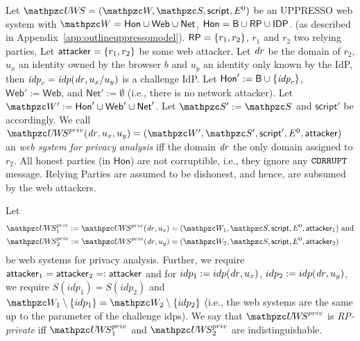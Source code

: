   \begin{definition}\label{def:uppresso-ws-priv}
    Let $\uppressowebsystem = (\bidsystem, \scriptset, \mathsf{script}, E^0)$ be an UPPRESSO web system with 
    $\bidsystem = \mathsf{Hon} \cup \mathsf{Web} \cup \mathsf{Net}$, 
    $\mathsf{Hon} = \mathsf{B} \cup \mathsf{RP} \cup \mathsf{IDP}$. (as described in Appendix~\ref{app:outlineuppressomodel}).
    $\mathsf{RP} = \{r_1,r_2\}$, $r_1$ and $r_2$ two relying parties, 
    Let $\mathsf{attacker} = \{r_1,r_2\}$ be some web attacker.
    Let $\mathit{dr}$ be the domain of $r_2$, $u_x$ an identity owned by the browser $b$ 
    and $u_y$ an identity only known by the IdP, then $\mathit{idp}_c = \mathit{idp}(\mathit{dr}, u_x/u_y)$ is a challenge IdP. 
    Let $\mathsf{Hon}' := \mathsf{B} \cup \{\mathit{idp}_c\}$, $\mathsf{Web}' := \mathsf{Web}$, and $\mathsf{Net}' := \emptyset$ (i.e., there is no network attacker).
    Let $\bidsystem' := \mathsf{Hon}' \cup \mathsf{Web}' \cup \mathsf{Net}'$. 
    Let $\scriptset' := \scriptset$ and $\mathsf{script}'$ be accordingly.
    We call $\uppressoprivwebsystem(\mi{dr}, u_x, u_y) = (\bidsystem', \scriptset', \mathsf{script}', E^0, \fAP{attacker})$ 
    an \emph{\uppresso web system for privacy analysis} 
    iff the domain $\mathit{dr}$ the only domain assigned to $r_2$. 
    All honest parties (in $\mathsf{Hon}$) are not corruptible, i.e., they ignore any $\mathtt{CORRUPT}$ message. 
    Relying Parties are assumed to be dishonest, and hence, are subsumed by the web attackers.
  \end{definition}
  
  \begin{definition}[RP-Privacy]\label{def:rp-privacy}
    Let 
    \begin{align*}
      \uppressoprivwebsystem_1 := \uppressoprivwebsystem(\mi{dr}, u_x) =
      (\bidsystem_1, \scriptset, \mathsf{script}, E^0, \fAP{attacker}_1)&\text{ and}\\
      \uppressoprivwebsystem_2 := \uppressoprivwebsystem(\mi{dr}, u_y) =
      (\bidsystem_2, \scriptset, \mathsf{script}, E^0, \fAP{attacker}_2)&
    \end{align*}
    be \uppresso web systems for privacy analysis. 
    Further, we require $\mathsf{attacker}_1 = \mathsf{attacker}_2 =: \mathsf{attacker}$ 
    and for $idp_1 := idp(\mathit{dr}, u_x)$, $idp_2 := idp(\mathit{dr}, u_y)$, 
    we require $S(idp_1) = S(idp_2)$ and $\bidsystem_1 \setminus \{idp_1\} = \bidsystem_2 \setminus \{idp_2\}$ 
    (i.e., the web systems are the same up to the parameter of the challenge idps).  
    We say that $\uppressoprivwebsystem$ is \emph{RP-private} iff $\uppressoprivwebsystem_1$ and $\uppressoprivwebsystem_2$ are indistinguishable.
  \end{definition}
  
